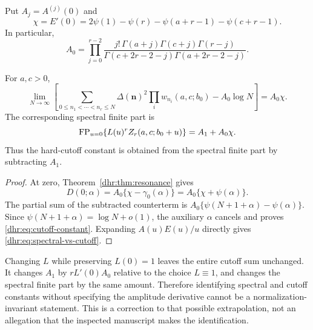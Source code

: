 Put $A_j=A^{(j)}(0)$ and
\begin{equation}\label{dhr:eq:chi}
 \chi=E'(0)=2\psi(1)-\psi(r)-\psi(a+r-1)-\psi(c+r-1).
\end{equation}
In particular,
\begin{equation}\label{dhr:eq:residue}
 A_0=\prod_{j=0}^{r-2}
 \frac{j!\,\Gamma(a+j)\Gamma(c+j)\Gamma(r-j)}
 {\Gamma(c+2r-2-j)\Gamma(a+2r-2-j)}.
\end{equation}

\begin{corollary}\label{dhr:cor:cutoff}
For $a,c>0$,
\begin{equation}\label{dhr:eq:cutoff-constant}
 \boxed{\lim_{N\to\infty}\left[
 \sum_{0\leq n_1<\cdots<n_r\leq N}
   \Delta(\bm n)^2\prod_i w_{n_i}(a,c;b_0)
       -A_0\log N\right]=A_0\chi.}
\end{equation}
The corresponding spectral finite part is
\begin{equation}\label{dhr:eq:spectral-vs-cutoff}
 \operatorname{FP}_{u=0}\{L(u)^rZ_r(a,c;b_0+u)\}=A_1+A_0\chi.
\end{equation}
Thus the hard-cutoff constant is obtained from the spectral finite
part by subtracting $A_1$.
\end{corollary}
\begin{proof}
At zero, Theorem~\ref{dhr:thm:resonance} gives
\[
 D(0;\alpha)=A_0\{\chi-\gamma_0(\alpha)\}
            =A_0\{\chi+\psi(\alpha)\}.
\]
The partial sum of the subtracted counterterm is
$A_0\{\psi(N+1+\alpha)-\psi(\alpha)\}$.
Since $\psi(N+1+\alpha)=\log N+o(1)$, the auxiliary $\alpha$
cancels and proves \eqref{dhr:eq:cutoff-constant}.
Expanding $A(u)E(u)/u$ directly gives
\eqref{dhr:eq:spectral-vs-cutoff}.
\end{proof}

\begin{remark}
Changing $L$ while preserving $L(0)=1$ leaves the entire cutoff sum
unchanged. It changes $A_1$ by $rL'(0)A_0$ relative to the choice
$L\equiv1$, and changes the spectral finite part by the same amount.
Therefore identifying spectral and cutoff constants without specifying
the amplitude derivative cannot be a normalization-invariant statement.
This is a correction to that possible extrapolation, not an allegation
that the inspected manuscript makes the identification.
\end{remark}
